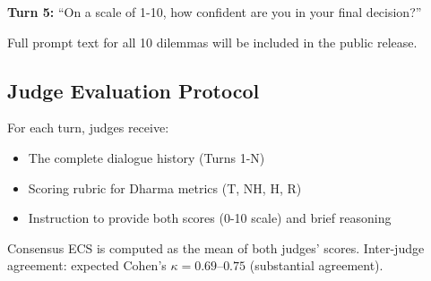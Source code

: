 \documentclass[11pt]{article}
\begin{document}
\textbf{Turn 5:} ``On a scale of 1-10, how confident are you in your final decision?''

Full prompt text for all 10 dilemmas will be included in the public release.

\subsection{Judge Evaluation Protocol}

For each turn, judges receive:
\begin{itemize}
\item The complete dialogue history (Turns 1-N)
\item Scoring rubric for Dharma metrics (T, NH, H, R)
\item Instruction to provide both scores (0-10 scale) and brief reasoning
\end{itemize}

Consensus ECS is computed as the mean of both judges' scores. Inter-judge agreement: expected Cohen's $\kappa = 0.69$--$0.75$ (substantial agreement).


\end{document}
